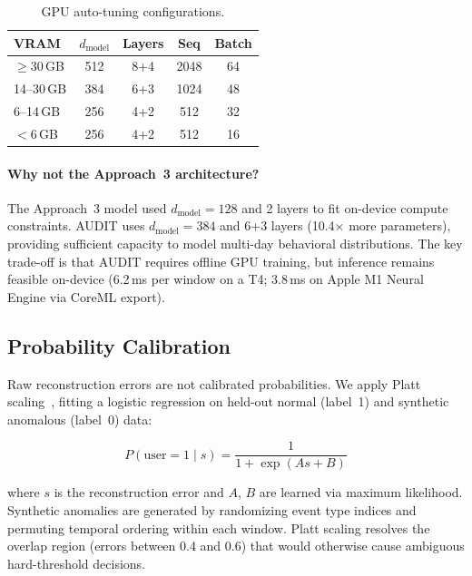 \documentclass[letterpaper,twocolumn,10pt]{article}
\begin{document}
\begin{table}[t]
\centering
\caption{GPU auto-tuning configurations.}
\label{tab:gpu_tiers}
\small
\begin{tabular}{@{}lcccc@{}}
\toprule
\textbf{VRAM} & $d_{\text{model}}$ & \textbf{Layers} & \textbf{Seq}
  & \textbf{Batch} \\
\midrule
$\geq$30\,GB & 512 & 8+4 & 2048 & 64 \\
14--30\,GB   & 384 & 6+3 & 1024 & 48 \\
6--14\,GB    & 256 & 4+2 & 512  & 32 \\
$<$6\,GB     & 256 & 4+2 & 512  & 16 \\
\bottomrule
\end{tabular}
\end{table}

\paragraph{Why not the Approach~3 architecture?}
The Approach~3 model used $d_\text{model}{=}128$ and 2 layers to
fit on-device compute constraints.  AUDIT uses
$d_\text{model}{=}384$ and 6+3 layers (10.4$\times$ more
parameters), providing sufficient capacity to model multi-day
behavioral distributions.  The key trade-off is that AUDIT requires
offline GPU training, but inference remains feasible on-device
(6.2\,ms per window on a T4; 3.8\,ms on Apple M1 Neural Engine via
CoreML export).


\subsection{Probability Calibration}

Raw reconstruction errors are not calibrated probabilities.  We
apply Platt scaling~\cite{platt}, fitting a logistic regression on
held-out normal (label~1) and synthetic anomalous (label~0) data:

\begin{equation}
P(\text{user}{=}1 \mid s) = \frac{1}{1 + \exp(As + B)}
\end{equation}

\noindent where $s$ is the reconstruction error and $A$, $B$ are
learned via maximum likelihood.  Synthetic anomalies are generated
by randomizing event type indices and permuting temporal ordering
within each window.  Platt scaling resolves the overlap region
(errors between 0.4 and 0.6) that would otherwise cause ambiguous
hard-threshold decisions.
\end{document}

